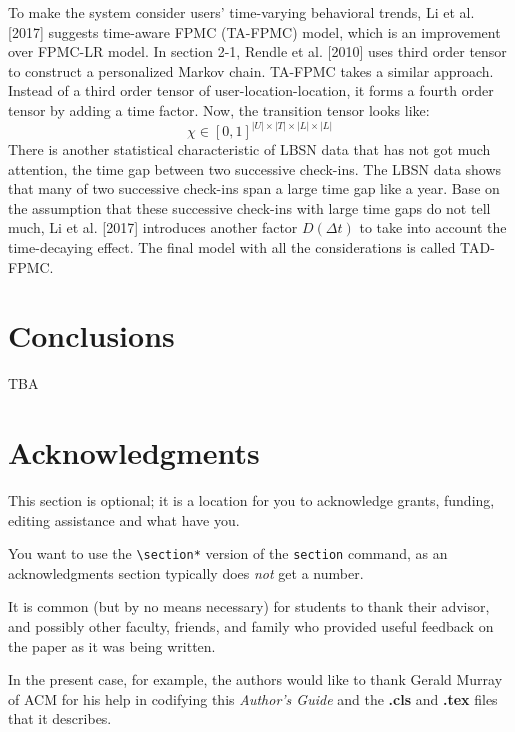 \documentclass{sig-alternate}
\begin{document}
To make the system consider users' time-varying behavioral trends, Li et al. [2017] suggests time-aware FPMC (TA-FPMC) 
model, which is an improvement over FPMC-LR model. In section 2-1, Rendle et al. [2010] uses third order tensor to 
construct a personalized Markov chain. TA-FPMC takes a similar approach. Instead of a third order tensor of 
user-location-location, it forms a fourth order tensor by adding a time factor. Now, the transition tensor looks like: 
\begin{equation}
	\chi \in [0, 1]^{|U| \times |T| \times |L| \times |L|}
\label{eq:TA-FPMC_tensor}
\end{equation}
There is another statistical characteristic of LBSN data that has not got much attention, the time gap between 
two successive check-ins. The LBSN data shows that many of two successive check-ins span a large time gap 
like a year. Base on the assumption that these successive check-ins with large time gaps do not tell much, 
Li et al. [2017] introduces another factor $D(\Delta t)$ to take into account the time-decaying effect. 
The final model with all the considerations is called TAD-FPMC.

\section{Conclusions}
\label{sec:conclusions}

TBA

\section*{Acknowledgments}
\label{sec:acknowledgments}

This section is optional; it is a location for you
to acknowledge grants, funding, editing assistance and
what have you.

You want to use the \texttt{\textbackslash section*} version of the \texttt{section}
command, as an acknowledgments section typically does \emph{not} get
a number.

It is common (but by no means necessary) for students to thank
their advisor, and possibly other faculty, friends, and family who provided
useful feedback on the paper as it was being written.

In the present case, for example, the
authors would like to thank Gerald Murray of ACM for
his help in codifying this \textit{Author's Guide}
and the \textbf{.cls} and \textbf{.tex} files that it describes.


  
\end{document}
